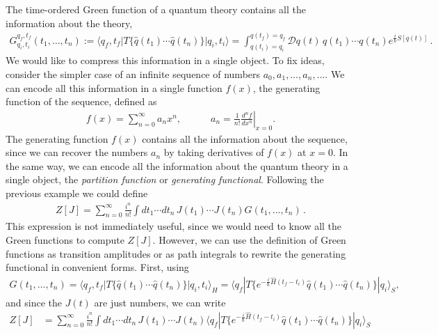\documentclass[../QFT_main.tex]{subfiles}
\begin{document}
\begin{mytheorem}
%
The time-ordered Green function of a quantum theory contains all the information about the theory,
{\small\begin{align}\label{eq:green_functions_vs_path_integral_1D}
    G_{q_i,t_i}^{q_f,t_f}(t_1,\ldots,t_n):=\langle q_f, t_f | T\{ \hat{q}(t_1) \cdots \hat{q}(t_n) \} | q_i, t_i \rangle = \int_{q(t_i)=q_i}^{q(t_f)=q_f} \mathcal{D}q(t)\, q(t_1)\cdots q(t_n) e^{\frac{i}{\hbar}S[q(t)]}\,.
\end{align}}
We would like to compress this information in a single object.
To fix ideas, consider the simpler case of an infinite sequence of numbers $a_0, a_1, \ldots, a_n, \ldots$.
We can encode all this information in a single function $f(x)$, the generating function of the sequence, defined as
{\small\begin{align}
    f(x) = \sum_{n=0}^{\infty} a_n x^n, \qquad \quad a_n = \frac{1}{n!} \left. \frac{d^n f}{dx^n} \right|_{x=0}.
\end{align}}
The generating function $f(x)$ contains all the information about the sequence, since we can recover the numbers $a_n$ by taking derivatives of $f(x)$ at $x=0$.
In the same way, we can encode all the information about the quantum theory in a single object, the \emph{partition function} or \emph{generating functional}.
Following the previous example we could define
{\small\begin{align}
    Z[J] = \sum_{n=0}^{\infty} \tfrac{i^n}{n!} \int dt_1 \cdots dt_n\, J(t_1)\cdots J(t_n) G(t_1,\ldots,t_n)\,.
\end{align}}
This expression is not immediately useful, since we would need to know all the Green functions to compute $Z[J]$.
However, we can use the definition of Green functions as transition amplitudes or as path integrals to rewrite the generating functional in convenient forms.
First, using 
{\small\begin{align}
    G(t_1,\ldots,t_n) = \langle q_f, t_f | T\{ \hat{q}(t_1) \cdots \hat{q}(t_n) \} | q_i, t_i \rangle_H
    =
    \langle q_f | T\{ e^{-\tfrac{i}{\hbar} \hat{H}(t_f-t_i)} \hat{q}(t_1) \cdots \hat{q}(t_n) \} | q_i \rangle_S,
\end{align}}
and since the $J(t)$ are just numbers, we can write
{\small\begin{align}
    Z[J] &= \sum_{n=0}^{\infty} \tfrac{i^n}{n!} \int dt_1 \cdots dt_n\, J(t_1)\cdots J(t_n) \langle q_f | T\{ e^{-\tfrac{i}{\hbar} \hat{H}(t_f-t_i)} \hat{q}(t_1) \cdots \hat{q}(t_n) \} | q_i \rangle_S

\end{align}}
\end{mytheorem}
\end{document}
